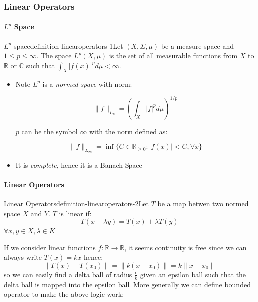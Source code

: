 \subsubsection{Linear Operators}

\paragraph{$L^p$ Space}

\begin{mystthmdefinition}{$L^p$ space}{definition-linearoperators-1}Let $(X,\Sigma, \mu)$ be a measure space and $1\leq p\leq \infty$. The space $L^p(X,\mu)$ is the set of all measurable functions from $X$ to $\mathbb{R}$ or $\mathbb{C}$ such that $\int_X |f(x)|^p d\mu < \infty$.

\begin{itemize}
\item Note $L^p$ is a \textit{normed space} with norm:

\begin{equation}
\|f\|_{L_p}=\left(\int_X |f|^p d\mu\right)^{1/p}
\end{equation}


$p$ can be the symbol $\infty$ with the norm defined as:

\begin{equation}
\|f\|_{L_{\infty}} = \inf\{C\in \mathbb{R}_{\geq 0} : |f(x)|<C, \forall x\}
\end{equation}


\item It is \textit{complete}, hence it is a Banach Space
\end{itemize}

\end{mystthmdefinition}
\paragraph{Linear Operators}

\begin{mystthmdefinition}{Linear Operators}{definition-linearoperators-2}Let $T$ be a map betwen two normed space $X$ and $Y$. $T$ is linear if:
\begin{equation}
T(x+\lambda y) = T(x) +\lambda T(y)
\end{equation}
$\forall x,y \in X, \lambda \in K$

\end{mystthmdefinition}
If we consider linear functions $f:\mathbb{R}\to \mathbb{R}$, it seems continuity is free since we can always write $T(x)=kx$ hence:
\begin{equation}
\|T(x)-T(x_0)\|=\|k(x-x_0)\|=k\|x-x_0\|
\end{equation}
so we can easily find a delta ball of radius $\frac{\epsilon}{k}$ given an epsilon ball such that the delta ball is mapped into the epsilon ball. More generally we can define bounded operator to make the above logic work:

